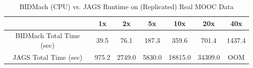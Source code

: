 \documentclass{article} %
\begin{document}
%
%
% 
%
%
\begin{table}[t]
\small
\caption{BIDMach (CPU) vs. JAGS Runtime on (Replicated) Real MOOC Data}
\label{tab:bidmach_jags_realmooc}
\begin{center}
\begin{tabular}{ |c|c|c|c|c|c|c| } 
\hline
                         & 1x    & 2x     & 5x     & 10x     & 20x     & 40x    \\
\hline \hline
BIDMach Total Time (sec) & 39.5  & 76.1   & 187.3  & 359.6   & 701.4   & 1437.4 \\ 
JAGS Total Time (sec)    & 975.2 & 2749.0 & 5830.0 & 18815.0 & 34309.0 & OOM    \\
\hline
\end{tabular}
\end{center}
\end{table}
\end{document}
